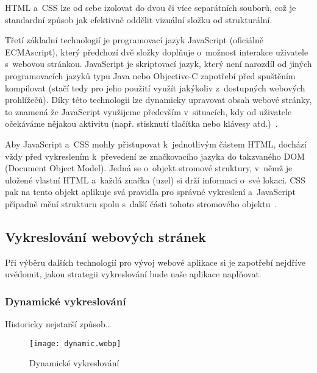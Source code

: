 HTML a~CSS lze od sebe izolovat do dvou či více separátních souborů, což je standardní způsob jak efektivně oddělit vizuální složku od strukturální.

Třetí základní technologií je programovací jazyk JavaScript (oficiálně ECMAscript), který předchozí dvě složky doplňuje o~možnost interakce uživatele s~webovou stránkou. JavaScript je skriptovací jazyk, který není narozdíl od jiných programovacích jazyků typu Java nebo Objective-C zapotřebí před spuštěním kompilovat (stačí tedy pro jeho použití využít jakýkoliv z~dostupných webových prohlížečů). Díky této technologii lze dynamicky upravovat obsah webové stránky, to znamená že JavaScript využijeme především v~situacích, kdy od uživatele očekáváme nějakou aktivitu (např. stisknutí tlačítka nebo klávesy atd.)~\parencite{javascript}.

Aby JavaScript a~CSS mohly přistupovat k~jednotlivým částem HTML, dochází vždy před vykreslením k~převedení ze značkovacího jazyka do takzvaného DOM (Document Object Model). Jedná se o~objekt stromové struktury, v~němž je uložené vlastní HTML a~každá značka (uzel) si drží informaci o~své lokaci. CSS pak na tento objekt aplikuje svá pravidla pro správné vykreslení a~JavaScript případně mění strukturu spolu s~další části tohoto stromového objektu~\parencite{howbrowserswork}.

\hypertarget{vykreslovuxe1nuxed-webovuxfdch-struxe1nek}{%
\subsection{Vykreslování webových stránek}\label{vykreslovuxe1nuxed-webovuxfdch-struxe1nek}}

Při výběru dalších technologií pro vývoj webové aplikace si je zapotřebí nejdříve uvědomit, jakou strategii vykreslování bude naše aplikace naplňovat.

\hypertarget{dynamickuxe9-vykreslovuxe1nuxed}{%
\subsubsection{Dynamické vykreslování}\label{dynamickuxe9-vykreslovuxe1nuxed}}

Historicky nejstarší způsob\ldots{}

 \begin{figure}
  \texttt{[image: dynamic.webp]}
  \caption{Dynamické vykreslování}
  \label{dynamic}
\end{figure}
